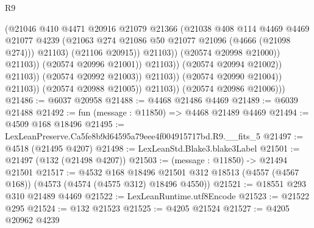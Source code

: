 \begin{lexlean}{R9}
\begin{coremodule}
                                                (@21046
                                                  @410
                                                  @4471
                                                  @20916
                                                  @21079
                                                  @21366
                                                  (@21038
                                                    @408
                                                    @114
                                                    @4469
                                                    @4469
                                                    @21077
                                                    @4239
                                                    (@21063
                                                      @274
                                                      @21086
                                                      @50
                                                      @21077
                                                      @21096
                                                      (@4666 (@21098 @274)))
                                                    @21103)
                                                  (@21106 @20915))
                                                @21103))
                                            (@20574 @20998 @21000))
                                          @21103))
                                      (@20574 @20996 @21001))
                                    @21103))
                                (@20574 @20994 @21002))
                              @21103))
                          (@20574 @20992 @21003))
                        @21103))
                    (@20574 @20990 @21004))
                  @21103))
              (@20574 @20988 @21005))
            @21103))
        (@20574 @20986 @21006)))
@21486 := @6037 @20958
@21488 := @4468 @21486 @4469
@21489 := @6039 @21488
@21492 := fun (message : @11850) => @4468 @21489 @4469
@21494 := @4509 @168 @18496
@21495 := LexLeanPreserve.Ca5fe8b9d64595a79eee4f004915717bd.R9.__fits_5
@21497 := @4518 (@21495 @4207)
@21498 := LexLeanStd.Blake3.blake3Label
@21501 := @21497 (@132 (@21498 @4207))
@21503 := (message : @11850) -> @21494 @21501
@21517 := @4532
    @168
    @18496
    @21501
    @312
    @18513
    (@4557 (@4567 @168))
    (@4573 (@4574 (@4575 @312) @18496 @4550))
@21521 := @18551 @293 @310 @21489 @4469
@21522 := LexLeanRuntime.utf8Encode
@21523 := @21522 @295
@21524 := @132 @21523
@21525 := @4205 @21524
@21527 := @4205 @20962 @4239

\end{coremodule}
\end{lexlean}
